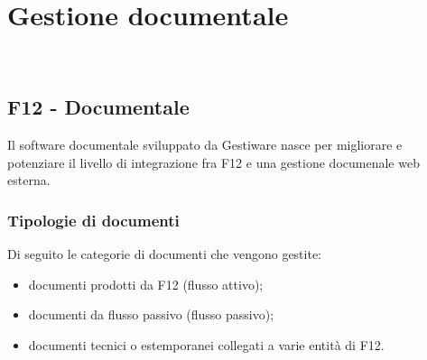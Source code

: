 
\chapter{Gestione documentale}
\label{cap:gestione-documentale}

\\

\section{F12 - Documentale}
Il software documentale sviluppato da Gestiware nasce per migliorare e potenziare il livello di integrazione fra F12 e una gestione documenale web esterna.

    \subsection{Tipologie di documenti}
    Di seguito le categorie di documenti che vengono gestite:
    \begin{itemize}
        \item documenti prodotti da F12 (flusso attivo);
        
        \item documenti da flusso passivo (flusso passivo);
        
        \item documenti tecnici o estemporanei collegati a varie entità di F12.
    \end{itemize}
    
